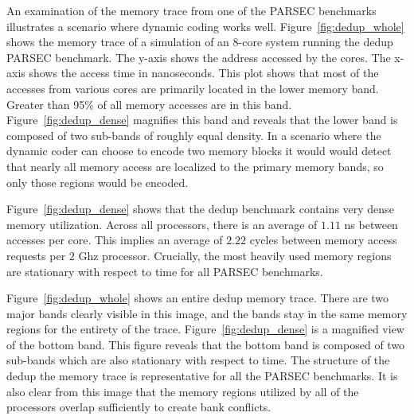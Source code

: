 An examination of the memory trace from one of the PARSEC benchmarks illustrates a scenario where dynamic coding works well. Figure~\ref{fig:dedup_whole} shows the memory trace of a simulation of an 8-core system running the dedup PARSEC benchmark. The y-axis shows the address accessed by the cores. The x-axis shows the access time in nanoseconds. This plot shows that most of the accesses from various cores are primarily located in the lower memory band. Greater than 95\% of all memory accesses are in this band. Figure~\ref{fig:dedup_dense} magnifies this band and reveals that the lower band is composed of two sub-bands of roughly equal density. In a scenario where the dynamic coder can choose to encode two memory blocks it would  would detect that nearly all memory access are localized to the primary memory bands, so only those regions would be encoded.


Figure~\ref{fig:dedup_dense} shows that the dedup benchmark contains very dense memory utilization. Across all processors, there is an average of $1.11$ ns between accesses per core. This implies an average of $2.22$ cycles between memory access requests per $2$ Ghz processor. Crucially, the most heavily used memory regions are stationary with respect to time for all PARSEC benchmarks. 

Figure~\ref{fig:dedup_whole} shows an entire dedup memory trace. There are two major bands clearly visible in this image, and the bands stay in the same memory regions for the entirety of the trace. Figure~\ref{fig:dedup_dense} is a magnified view of the bottom band. This figure reveals that the bottom band is composed of two sub-bands which are also stationary with respect to time. The structure of the dedup the memory trace is representative for all the PARSEC benchmarks. It is also clear from this image that the memory regions utilized by all of the processors overlap sufficiently to create bank conflicts.

